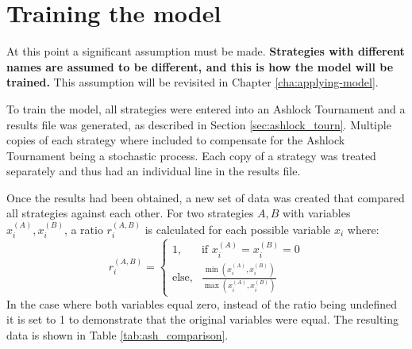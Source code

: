 \section{Training the model}\label{sec:training_model}

At this point a significant assumption must be made.
\textbf{Strategies with different names are assumed to be different, and this is how the model will be trained.}
This assumption will be revisited in Chapter \ref{cha:applying-model}.

To train the model, all strategies were entered into an Ashlock Tournament and a results file was generated, as described in Section \ref{sec:ashlock_tourn}.
Multiple copies of each strategy where included to compensate for the Ashlock Tournament being a stochastic process.
Each copy of a strategy was treated separately and thus had an individual line in the results file.

Once the results had been obtained, a new set of data was created that compared all strategies against each other.
For two strategies $A, B$ with variables $x_i^{(A)}, x_i^{(B)}$, a ratio $r_i^{(A, B)}$ is calculated for each possible variable $x_i$ where:
$$
r_i^{(A, B)} =
\begin{cases}
1, & \mbox{if } x_i^{(A)}=x_i^{(B)}=0  \\
\text{else}, & \frac{\min(x_i^{(A)}, x_i^{(B)})}{\max(x_i^{(A)}, x_i^{(B)})}
\end{cases}
$$
In the case where both variables equal zero, instead of the ratio being undefined it is set to 1 to demonstrate that the original variables were equal.
The resulting data is shown in Table \ref{tab:ash_comparison}.

